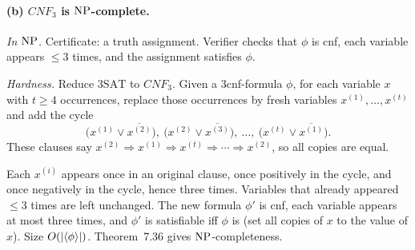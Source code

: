 \begin{soln}
\paragraph{(b) $\mathit{CNF}_3$ is $\mathrm{NP}$-complete.}
\emph{In $\mathrm{NP}$.} Certificate: a truth assignment. Verifier checks that $\phi$ is cnf, each variable appears $\le 3$ times, and the assignment satisfies $\phi$.

\emph{Hardness.} Reduce $3\mathrm{SAT}$ to $\mathit{CNF}_3$. Given a $3$cnf-formula $\phi$, for each variable $x$ with $t\ge 4$ occurrences, replace those occurrences by fresh variables $x^{(1)},\dots,x^{(t)}$ and add the cycle
\[
\bigl(x^{(1)}\lor\overline{x^{(2)}}\bigr),\ 
\bigl(x^{(2)}\lor\overline{x^{(3)}}\bigr),\ 
\dots,\ 
\bigl(x^{(t)}\lor\overline{x^{(1)}}\bigr).
\]
These clauses say $x^{(2)}\Rightarrow x^{(1)}\Rightarrow x^{(t)}\Rightarrow\cdots\Rightarrow x^{(2)}$, so all copies are equal.

Each $x^{(i)}$ appears once in an original clause, once positively in the cycle, and once negatively in the cycle, hence three times. Variables that already appeared $\le 3$ times are left unchanged. The new formula $\phi'$ is cnf, each variable appears at most three times, and $\phi'$ is satisfiable iff $\phi$ is (set all copies of $x$ to the value of $x$). Size $O(|\langle \phi\rangle|)$. Theorem~7.36 gives $\mathrm{NP}$-completeness.
\end{soln}


